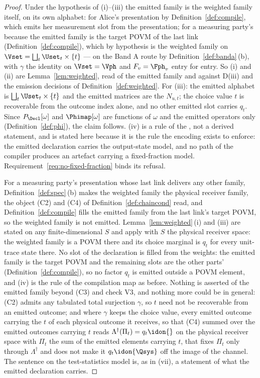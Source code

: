 \begin{proof}
Under the hypothesis of (i)--(iii) the emitted family is the weighted family
itself, on its own alphabet: for Alice's presentation by
Definition~\ref{def:compile}, which emits her measurement slot from the
presentation; for a measuring party's because the emitted family is the
target POVM of the last link (Definition~\ref{def:compile}), which by
hypothesis is the weighted family on $\Vset=\bigsqcup_t\Uset_t\times\{t\}$
--- on the Band A route by Definition~\ref{def:banda}\,(b), with $\gamma$ the
identity on $\Vset=\Vph$ and $F_v=\Fph_v$ entry for entry. So (i) and (ii)
are Lemma~\ref{lem:weighted}, read of the emitted family and against D(iii)
and the emission decisions of Definition~\ref{def:weighted}. For (iii): the
emitted alphabet is $\bigsqcup_t\Uset_t\times\{t\}$ and the emitted matrices
are the $N_{u,t}$; the choice value $t$ is recoverable from the outcome index
alone, and no other emitted slot carries $q_t$. Since $P_{\Decl}[\omega]$ and
$\Phimap[\omega]$ are functions of $\omega$ and the emitted operators only
(Definition~\ref{def:phi}), the claim follows. (iv) is a rule of the
, not a derived statement, and is stated here because it
is the rule the encoding exists to enforce: the emitted declaration carries
the output-state model, and no path of the compiler produces an artefact
carrying a fixed-fraction model. Requirement~\ref{req:no-fixed-fraction}
binds its refusal.

For a measuring party's presentation whose last link delivers any other
family, Definition~\ref{def:spec}\,(b) makes the weighted family the physical
receiver family, the object (C2) and (C4) of Definition~\ref{def:chaincond}
read, and Definition~\ref{def:compile} fills the emitted family from the last
link's target POVM, so the weighted family is not emitted. Lemma~\ref{lem:weighted}\,(i)
and (iii) are stated on any finite-dimensional $S$ and apply with $S$ the
physical receiver space: the weighted family is a POVM there and its choice
marginal is $q_t$ for every unit-trace state there. No slot of the
declaration is filled from the weights: the emitted family is the target
POVM and the remaining slots are the other parts' (Definition~\ref{def:compile}),
so no factor $q_t$ is emitted outside a POVM element, and (iv) is the rule
of the compilation map as before. Nothing is asserted of the emitted family
beyond (C3) and check V3, and nothing more could be in general: (C2) admits
any tabulated total surjection $\gamma$, so $t$ need not be recoverable from
an emitted outcome; and where $\gamma$ keeps the choice value, every emitted
outcome carrying the $t$ of each physical outcome it receives, so that (C4)
summed over the emitted outcomes carrying $t$ reads
$\Lambda^{\dagger}(\Pi_t)=q_t\idon{}$ on the physical receiver space with
$\Pi_t$ the sum of the emitted elements carrying $t$, that fixes $\Pi_t$
only through $\Lambda^{\dagger}$ and does not make it $q_t\idon{\Qsys}$ off
the image of the channel. The
sentence on the test-statistics model is, as in (vii), a statement of what
the emitted declaration carries.


\end{proof}
